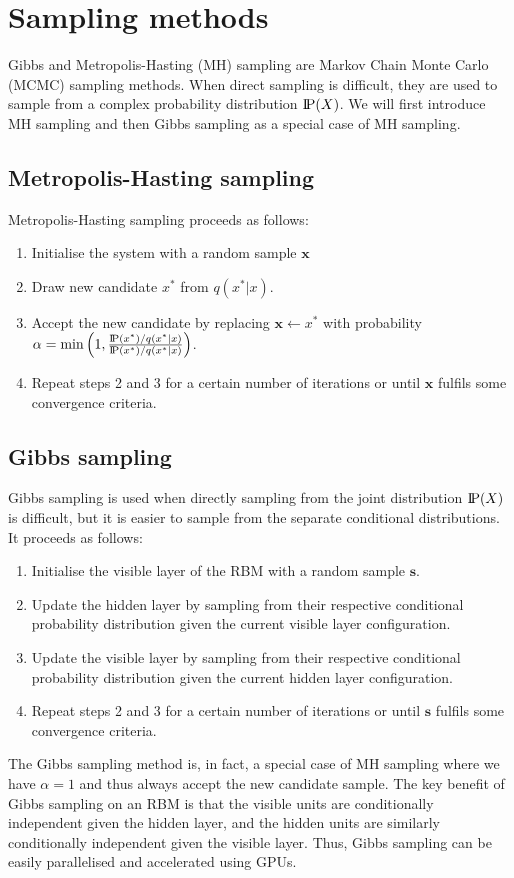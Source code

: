 \section{Sampling methods}\label{samplingmethods}
Gibbs and Metropolis-Hasting (MH) sampling are Markov Chain Monte Carlo (MCMC) sampling methods. When direct sampling is difficult, they are used to sample from a complex probability distribution $\text{I\kern-0.15em P}(X)$. We will first introduce MH sampling and then Gibbs sampling as a special case of MH sampling.

\subsection*{Metropolis-Hasting sampling}
Metropolis-Hasting sampling \cite{metropolissampling} proceeds as follows:
\begin{enumerate}
    \item Initialise the system with a random sample $\mathbf{x}$
    \item Draw new candidate $x^*$ from $q(x^*|x)$.
    \item Accept the new candidate by replacing $\mathbf{x} \leftarrow x^*$ with probability $\alpha = \min \left(1, \frac{\text{I\kern-0.15em P}(x^*)/q(x^*|x)}{\text{I\kern-0.15em P}(x^*)/q(x^*|x)}\right)$.
    \item Repeat steps 2 and 3 for a certain number of iterations or until $\mathbf{x}$ fulfils some convergence criteria.
\end{enumerate}

\subsection*{Gibbs sampling}
Gibbs sampling \cite{gibbssampling} is used when directly sampling from the joint distribution $\text{I\kern-0.15em P}(X)$ is difficult, but it is easier to sample from the separate conditional distributions. It proceeds as follows:

\begin{enumerate}
    \item Initialise the visible layer of the RBM with a random sample $\mathbf{s}$.
    \item Update the hidden layer by sampling from their respective conditional probability distribution given the current visible layer configuration.
    \item Update the visible layer by sampling from their respective conditional probability distribution given the current hidden layer configuration.
    \item Repeat steps 2 and 3 for a certain number of iterations or until $\mathbf{s}$ fulfils some convergence criteria.
\end{enumerate}

The Gibbs sampling method is, in fact, a special case of MH sampling where we have $\alpha = 1$ and thus always accept the new candidate sample. The key benefit of Gibbs sampling on an RBM is that the visible units are conditionally independent given the hidden layer, and the hidden units are similarly conditionally independent given the visible layer. Thus, Gibbs sampling can be easily parallelised and accelerated using GPUs.